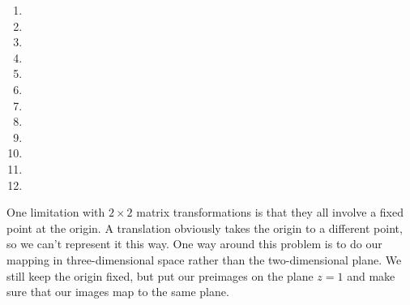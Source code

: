 \documentclass[../gatm.tex]{subfiles}
\begin{document}
\begin{enumerate}
\begin{multicols}{4}
\begin{enumerate}
\item {}
\item {}
\item {}
\item {}
\item {}
\item {}
\item {}
\item {}
\item {}
\item {}
\item {}
\item {}
\end{enumerate}
\end{multicols}
\setcounter{mp_problem_i}{\value{enumi}}
\end{enumerate}

\noindent One limitation with $2\times 2$ matrix transformations is that they all involve a fixed point at the origin. A translation obviously takes the origin to a different point, so we can't represent it this way. One way around this problem is to do our mapping in three-dimensional space rather than the two-dimensional plane. We still keep the origin fixed, but put our preimages on the plane $z=1$ and make sure that our images map to the same plane.
\end{document}
